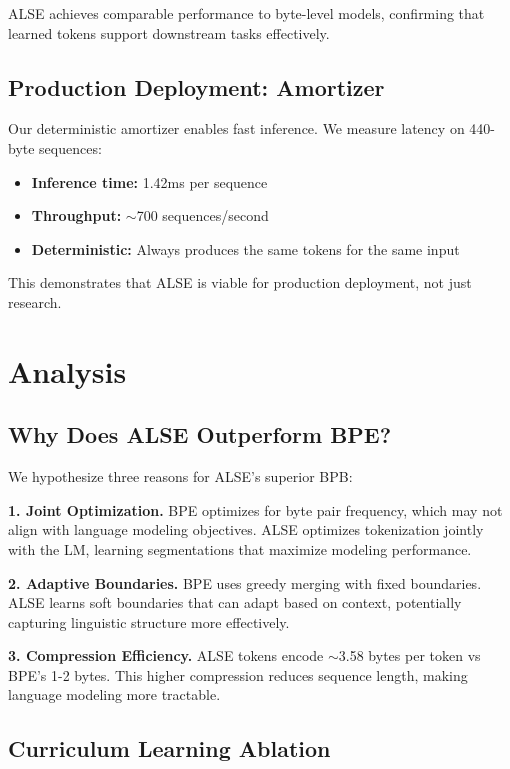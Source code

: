 \documentclass{article}
\begin{document}
ALSE achieves comparable performance to byte-level models, confirming that learned tokens support downstream tasks effectively.

\subsection{Production Deployment: Amortizer}

Our deterministic amortizer enables fast inference. We measure latency on 440-byte sequences:

\begin{itemize}
    \item \textbf{Inference time:} 1.42ms per sequence
    \item \textbf{Throughput:} $\sim$700 sequences/second
    \item \textbf{Deterministic:} Always produces the same tokens for the same input
\end{itemize}

This demonstrates that ALSE is viable for production deployment, not just research.

\section{Analysis}

\subsection{Why Does ALSE Outperform BPE?}

We hypothesize three reasons for ALSE's superior BPB:

\textbf{1. Joint Optimization.} BPE optimizes for byte pair frequency, which may not align with language modeling objectives. ALSE optimizes tokenization jointly with the LM, learning segmentations that maximize modeling performance.

\textbf{2. Adaptive Boundaries.} BPE uses greedy merging with fixed boundaries. ALSE learns soft boundaries that can adapt based on context, potentially capturing linguistic structure more effectively.

\textbf{3. Compression Efficiency.} ALSE tokens encode $\sim$3.58 bytes per token vs BPE's 1-2 bytes. This higher compression reduces sequence length, making language modeling more tractable.

\subsection{Curriculum Learning Ablation}
\end{document}
